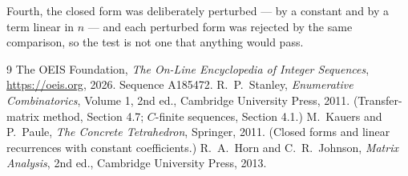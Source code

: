 \documentclass[11pt,a4paper]{article}
\theoremstyle{plain}
\theoremstyle{definition}
\begin{document}
Fourth, the closed form was deliberately perturbed --- by a constant and by a term linear in
$n$ --- and each perturbed form was rejected by the same comparison, so the test is not one
that anything would pass.

\begin{thebibliography}{9}
 The OEIS Foundation, \emph{The On-Line Encyclopedia of Integer
Sequences}, \url{https://oeis.org}, 2026. Sequence A185472.
 R.~P.~Stanley, \emph{Enumerative Combinatorics}, Volume 1, 2nd ed.,
Cambridge University Press, 2011. (Transfer-matrix method, Section 4.7; $C$-finite sequences,
Section 4.1.)
 M.~Kauers and P.~Paule, \emph{The Concrete Tetrahedron}, Springer, 2011.
(Closed forms and linear recurrences with constant coefficients.)
 R.~A.~Horn and C.~R.~Johnson, \emph{Matrix Analysis}, 2nd ed., Cambridge
University Press, 2013.
\end{thebibliography}
\end{document}
